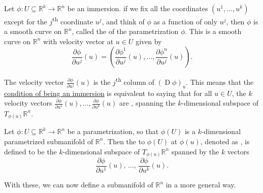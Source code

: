 \documentclass[notoc,notitlepage]{tufte-book}
\DeclareMathOperator{\D}{D}
\begin{document}
\begin{defn}\label{defn:_j_th_coordinate_curve}
  Let $\phi : U \subseteq \mathbb{R}^k \to \mathbb{R}^n$ be an immersion. if we
  fix all the coordinates $(u^1, \ldots, u^k)$ except for the
  $j$\textsuperscript{th} coordinate $u^j$, and think of $\phi$ as a function of
  only $u^j$, then $\phi$ is a smooth curve on $\mathbb{R}^n$, called the
   of the parametrization
  $\phi$. This is a smooth curve on $\mathbb{R}^n$ with velocity vector at $u
  \in U$ given by
  \begin{equation*}
    \frac{\partial \phi}{\partial u^j} (u) = \left( \frac{\partial
      \phi^1}{\partial u^j} (u) , \ldots, \frac{\partial \phi^n}{\partial u^j}
      (u) \right).
  \end{equation*}
\end{defn}

\begin{note}
  The velocity vector $\frac{\partial \phi}{\partial u^j} (u)$ is the
  $j$\textsuperscript{th} column of $(\D \phi)_u$. This means that the
  \hyperref[defn:immersion]{condition of being an immersion} is equivalent to
  saying that for all $u \in U$, the $k$ velocity vectors $\frac{\partial
  \phi}{\partial u^1} (u), \ldots, \frac{\partial \phi}{\partial u^k} (u)$ are
  , spanning the $k$-dimensional subspace of
  $T_{\phi(u)} \mathbb{R}^n$.
\end{note}

\begin{defn}\label{defn:tangent_space_on_a_submanifold}
  Let $\phi : U \subseteq \mathbb{R}^k \to \mathbb{R}^n$ be a parametrization,
  so that $\phi(U)$ is a $k$-dimensional parametrized submanifold of
  $\mathbb{R}^n$. Then the  to $\phi(U)$ at $\phi(u)$,
  denoted as , is defined to be the
  $k$-dimensional subspace of $T_{\phi(u)} \mathbb{R}^n$ spanned by the $k$
  vectors
  \begin{equation*}
    \frac{\partial \phi}{\partial u^1} (u), \, \ldots, \, \frac{\partial
    \phi}{\partial u^k} (u).
  \end{equation*}
\end{defn}

With these, we can now define a submanifold of $\mathbb{R}^n$ in a more general
way.
\end{document}
